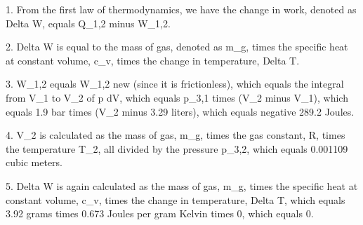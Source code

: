 1. From the first law of thermodynamics, we have the change in work, denoted as Delta W, equals Q_{1,2} minus W_{1,2}.

2. Delta W is equal to the mass of gas, denoted as m_{g}, times the specific heat at constant volume, c_v, times the change in temperature, Delta T.

3. W_{1,2} equals W_{1,2} new (since it is frictionless),
   which equals the integral from V_1 to V_2 of p dV,
   which equals p_{3,1} times (V_2 minus V_1),
   which equals 1.9 bar times (V_2 minus 3.29 liters),
   which equals negative 289.2 Joules.

4. V_2 is calculated as the mass of gas, m_{g}, times the gas constant, R, times the temperature T_2, all divided by the pressure p_{3,2}, which equals 0.001109 cubic meters.

5. Delta W is again calculated as the mass of gas, m_{g}, times the specific heat at constant volume, c_v, times the change in temperature, Delta T,
   which equals 3.92 grams times 0.673 Joules per gram Kelvin times 0,
   which equals 0.
